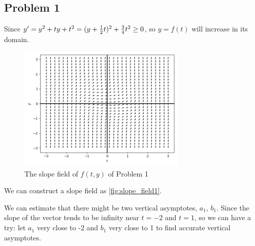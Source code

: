 \documentclass[a4paper]{article}
\begin{document}
	\subsection{Problem 1}
	
	Since $y' = y^2 + ty + t^2 = (y + {1 \over 2}t)^2 + {3 \over 4}t^2 \geq 0$, so $y = f(t)$ will increase in its domain.
	
	\begin{figure}[H]
		\centering
		\includegraphics[width=8cm]{img/slope_field1.png}
		\caption{\label{fig:slope_field1} The slope field of $f(t, y)$ of Problem 1}
	\end{figure}

	We can construct a slope field as \autoref{fig:slope_field1}.
	
	We can estimate that there might be two vertical asymptotes, $a_1$, $b_1$. Since the slope of the vector tends to be infinity near $t=-2$ and $t=1$, so we can have a try: let $a_1$ very close to -2 and $b_1$ very close to 1 to find accurate vertical asymptotes.
	
\end{document}
